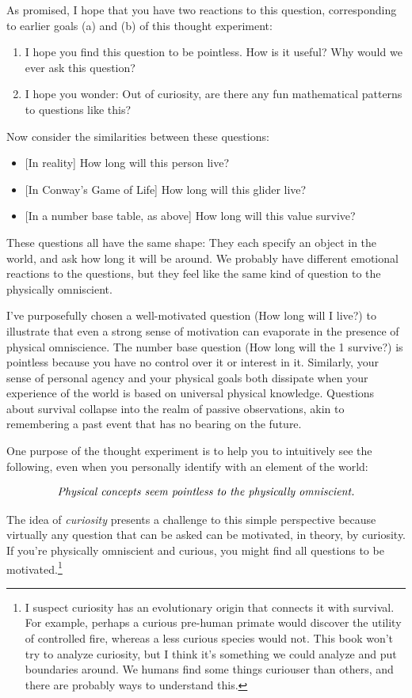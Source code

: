 \documentclass[9pt, twoside]{book}
\theoremstyle{argtstyle}
\begin{document}
As promised, I hope that you have two reactions to this question, corresponding
to earlier goals (a) and (b) of this thought experiment:
\begin{enumerate}
    \item I hope you find this question to be pointless. How is it useful?
        Why would we ever ask this question?
    \item I hope you wonder:
        Out of curiosity, are there any fun mathematical patterns to questions
        like this?
\end{enumerate}

Now consider the similarities between these questions:
\begin{itemize}
    \item{} [In reality] How long will this person live?
    \item{} [In Conway's Game of Life] How long will this glider live?
    \item{} [In a number base table, as above] How long will this value survive?
\end{itemize}
These questions all have the same shape: They each specify an
object in the world, and ask how long it will be around.
We probably have different emotional reactions to the questions, but they feel
like the same kind of question to the physically omniscient.

I've
purposefully chosen a well-motivated question (How long will I
live?) to illustrate that even a strong sense of motivation can evaporate
in the presence of physical omniscience.
The number base question (How long will the 1 survive?) is
pointless because you have no control over it or interest in it.
Similarly, your sense of personal agency
and your physical goals both dissipate when your experience of the world is
based
on universal physical knowledge. Questions about survival collapse into the
realm of passive observations, akin to remembering a past event that has no
bearing on the future.

One purpose of the thought experiment is to help you to intuitively
see the following, even when you personally identify with an
element of the world:

\begin{equation}\label{eq3}
    \text{\em Physical concepts seem pointless to the physically omniscient.}
\end{equation}

The idea of {\em curiosity} presents a challenge to
this simple perspective because
virtually any question that can be asked can be motivated, in theory, by
curiosity. If you're physically omniscient and curious, you might find all
questions to be motivated.\footnote{I suspect curiosity has an evolutionary
origin that connects it with survival. For example, perhaps a curious pre-human
primate would discover the utility of controlled fire, whereas a less curious
species would not. This book won't try to analyze curiosity, but I think it's
something we could analyze and put boundaries around. We humans find some things
curiouser than others, and there are probably ways to understand this.}
\end{document}
